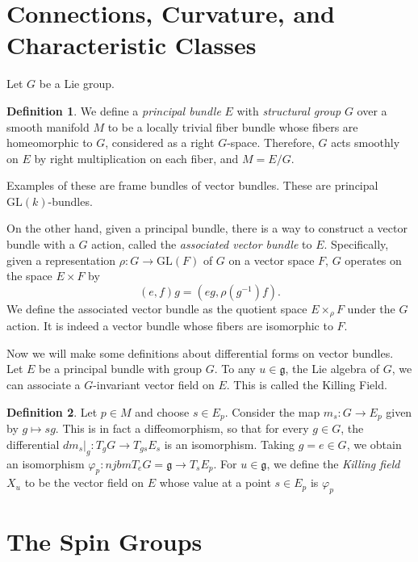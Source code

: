 \documentclass[12pt, reqno]{extarticle}
\theoremstyle{plain}
\theoremstyle{definition}
\newtheorem{definition}{Definition}[section]
\theoremstyle{remark}
\renewcommand{\phi}{\varphi}
\begin{document}
\section{Connections, Curvature, and Characteristic Classes}

Let $G$ be a Lie group. 

\begin{definition}
    We define a \textit{principal bundle} $E$ with \textit{structural group} $G$ over a smooth 
    manifold $M$ to be a locally trivial fiber bundle whose fibers are homeomorphic to $G$,
    considered as a right $G$-space. Therefore, $G$ acts smoothly on $E$ by right multiplication on 
    each fiber, and $M = E/G$. 
\end{definition}

Examples of these are frame bundles of vector bundles. These are principal $\textrm{GL}(k)$-bundles.

On the other hand, given a principal bundle, there is a way to construct a vector bundle 
with a $G$ action, called the \textit{associated vector bundle} to $E$. Specifically,
given a representation $\rho: G \to \text{GL}(F)$ of $G$ on a vector space $F$, 
$G$ operates on the space $E \times F$ by
\[
    (e,f)g = (eg, \rho(g^{-1})f).
\]
We define the associated vector bundle as the quotient space $E \times_\rho F$ under the $G$ action. 
It is indeed a vector bundle whose fibers are isomorphic to $F$.

Now we will make some definitions about differential forms on vector bundles. Let $E$ be a principal bundle
with group $G$. To any $u \in \mathfrak{g}$, the Lie algebra of $G$, we can associate a $G$-invariant
vector field on $E$. This is called the Killing Field. 

\begin{definition}
    Let $p \in M$ and choose $s \in E_p$. Consider the map $m_s: G \to E_p$ given by 
    $g \mapsto sg$. This is in fact a diffeomorphism, so that for every $g \in G$, the 
    differential $dm_s|_g: T_gG \to T_{gs}E_s$ is an isomorphism. Taking $g = e \in G$, we
    obtain an isomorphism $\phi_p:njbmT_eG = \mathfrak{g} \to T_s E_p$. For $u \in \mathfrak{g}$,
    we define the \textit{Killing field} $X_u$ to be the vector field on $E$ whose 
    value at a point $s \in E_p$ is $\phi_p$
\end{definition}


\section{The Spin Groups}
\end{document}
